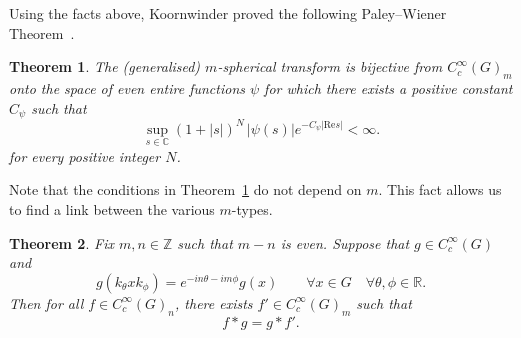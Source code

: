 \documentclass[12pt,a4paper]{amsart}
\newtheorem{thm}{Theorem}[section]
\theoremstyle{definition}
\theoremstyle{remark}
\numberwithin{equation}{section}
\newcommand{\R}{\mathbb{R}}
\newcommand{\Z}{\mathbb{Z}}
\newcommand{\Discr}{\mathbb{D}_m}
\newcommand{\eb}{\mathbf{e}}
\newcommand{\var}{s}
\begin{document}
\bigskip



\bigskip


Using the facts above, Koornwinder proved the following Paley--Wiener Theorem~\cite[Theorem 2.1]{Koo}.

\begin{thm}\label{thm:PW}
The (generalised) $m$-spherical transform is bijective  from  $C^\infty_c(G)_m$ onto the space of even entire functions $\psi$ for which there exists a positive constant $C_\psi$ such that
\begin{equation}\label{e:uet}
\sup_{\var\in \mathbb C} (1+|\var|)^{N}\, |\psi(\var)| e^{-C_\psi |\mathrm{Re} \var|}<\infty.
\end{equation}
 for every positive integer $N$.
\end{thm}

Note that the conditions in Theorem~\ref{thm:PW} do not depend on $m$. This fact allows us to 
find a link between the various $m$-types.
%
%



\begin{thm}\label{thm:f-star-g}
Fix $m,n \in \Z$ such that $m-n$ is even.
Suppose that $g \in C^\infty_c(G)$ and 
\begin{equation}\label{eq:invariance-mn}
g(k_\theta x k_\phi) = e^{-i n\theta-im\phi}  g(x) 
\qquad\forall x \in G  \quad\forall \theta, \phi \in \R.
\end{equation}
Then for all $f \in C^\infty_c(G)_n$, there exists $f' \in C^\infty_c(G)_m$ such that 
\[
f * g = g * f'  .
\]
\end{thm}
\end{document}
